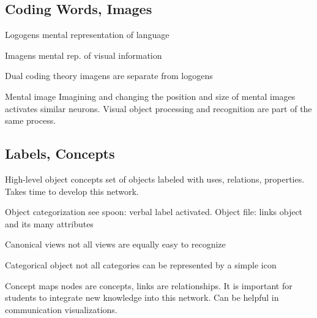 



\begin{mdframed}\begin{multicols}{2}
\subsection{Coding Words, Images}
\begin{compactdesc}
    \item[Logogens] mental representation of language
    \item[Imagens] mental rep. of visual information
    \item[Dual coding theory] imagens are separate from logogens
    \item[Mental image] Imagining and changing the position and size of
        mental images activates similar neurons.
        Visual object processing and recognition are part of
        the same process.
\end{compactdesc}


\subsection{Labels, Concepts}
\begin{compactdesc}
\item[High-level object concepts] set of objects labeled with uses, relations,
    properties. Takes time to develop this network.
\item[Object categorization] see spoon: verbal label activated. Object file:
    links object and its many attributes
\item[Canonical views] not all views are equally easy to recognize
\item[Categorical object] not all categories can be represented by a simple
    icon
    \midrule
\item[Concept maps] nodes are concepts, links are relationships. It is
    important for students to integrate new knowledge into this network.
    Can be helpful in communication visualizations.
\end{compactdesc}
\end{multicols}\end{mdframed}


